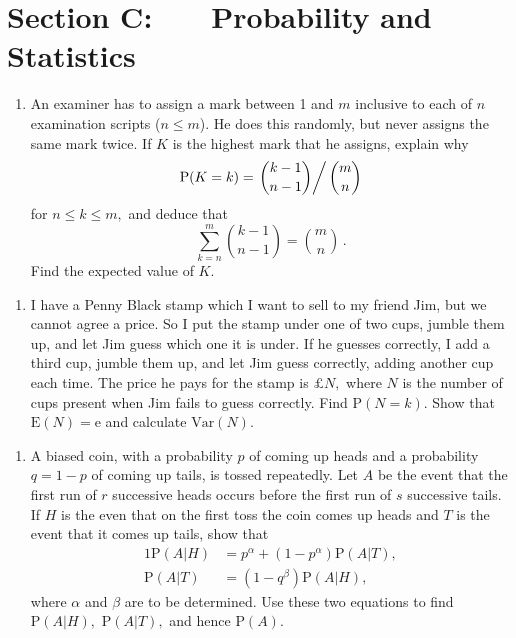 \documentclass[a4, 11pt]{report}
\newlength{\qspace}
\newcounter{qnumber}
\newenvironment{question}%
 {\vspace{\qspace}
  \begin{enumerate}[\bfseries 1\quad][10]%
    \setcounter{enumi}{\value{qnumber}}%
    \item%
 }
{
  \end{enumerate}
  \filbreak
  \stepcounter{qnumber}
 }
\begin{document}
	
	\newpage
\section*{Section C: \ \ \ Probability and Statistics}


\begin{question}
An examiner has to assign a mark between 1 and $m$ inclusive to each
of $n$ examination scripts ($n\leqslant m$). He does this randomly,
but never assigns the same mark twice. If $K$ is the highest mark
that he assigns, explain why 
\[
\mathrm{P}(K=k)=\left.\binom{k-1}{n-1}\right/\binom{m}{n}
\]
for $n\leqslant k\leqslant m,$ and deduce that 
\[
\sum_{k=n}^{m}\binom{k-1}{n-1}=\binom{m}{n}\,.
\]
Find the expected value of $K$. 
\end{question}

\begin{question}
I have a Penny Black stamp which I want to sell to my friend Jim,
but we cannot agree a price. So I put the stamp under one of two cups,
jumble them up, and let Jim guess which one it is under. If he guesses
correctly, I add a third cup, jumble them up, and let Jim guess correctly,
adding another cup each time. The price he pays for the stamp is $\pounds N,$
where $N$ is the number of cups present when Jim fails to guess correctly.
Find $\mathrm{P}(N=k)$. Show that $\mathrm{E}(N)=\mathrm{e}$ and
calculate $\mathrm{Var}(N).$ 
\end{question}

\begin{question}
A biased coin, with a probability $p$ of coming up heads and a probability
$q=1-p$ of coming up tails, is tossed repeatedly. Let $A$ be the
event that the first run of $r$ successive heads occurs before the
first run of $s$ successive tails. If $H$ is the even that on the
first toss the coin comes up heads and $T$ is the event that it comes
up tails, show that 
\begin{alignat*}{1}
\mathrm{P}(A|H) & =p^{\alpha}+(1-p^{\alpha})\mathrm{P}(A|T),\\
\mathrm{P}(A|T) & =(1-q^{\beta})\mathrm{P}(A|H),
\end{alignat*}
where $\alpha$ and $\beta$ are to be determined. Use these two equations
to find $\mathrm{P}(A|H),$ $\mathrm{P}(A|T),$ and hence $\mathrm{P}(A).$
\end{question}
	
\end{document}

